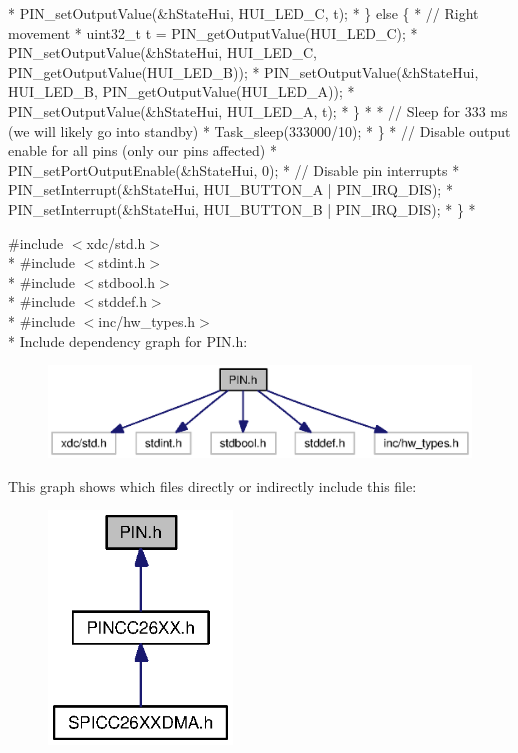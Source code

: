 \begin{DoxyCode}
*                PIN_setOutputValue(&hStateHui, HUI\_LED\_C, t);
*            \} \textcolor{keywordflow}{else} \{
*                \textcolor{comment}{// Right movement}
*                uint32\_t t = PIN_getOutputValue(HUI\_LED\_C);
*                PIN_setOutputValue(&hStateHui, HUI\_LED\_C, PIN_getOutputValue(HUI\_LED\_B));
*                PIN_setOutputValue(&hStateHui, HUI\_LED\_B, PIN_getOutputValue(HUI\_LED\_A));
*                PIN_setOutputValue(&hStateHui, HUI\_LED\_A, t);
*            \}
*
*            \textcolor{comment}{// Sleep for 333 ms (we will likely go into standby)}
*            Task\_sleep(333000/10);
*        \}
*        \textcolor{comment}{// Disable output enable for all pins (only our pins affected)}
*        PIN_setPortOutputEnable(&hStateHui, 0);
*        \textcolor{comment}{// Disable pin interrupts}
*        PIN_setInterrupt(&hStateHui, HUI\_BUTTON\_A | PIN_IRQ_DIS);
*        PIN_setInterrupt(&hStateHui, HUI\_BUTTON\_B | PIN_IRQ_DIS);
*    \}
*    
\end{DoxyCode}
 {\ttfamily \#include $<$xdc/std.\-h$>$}\\*
{\ttfamily \#include $<$stdint.\-h$>$}\\*
{\ttfamily \#include $<$stdbool.\-h$>$}\\*
{\ttfamily \#include $<$stddef.\-h$>$}\\*
{\ttfamily \#include $<$inc/hw\-\_\-types.\-h$>$}\\*
Include dependency graph for P\-I\-N.\-h\-:
\nopagebreak
\begin{figure}[H]
\begin{center}
\leavevmode
\includegraphics[width=350pt]{_p_i_n_8h__incl}
\end{center}
\end{figure}
This graph shows which files directly or indirectly include this file\-:
\nopagebreak
\begin{figure}[H]
\begin{center}
\leavevmode
\includegraphics[width=139pt]{_p_i_n_8h__dep__incl}
\end{center}
\end{figure}
